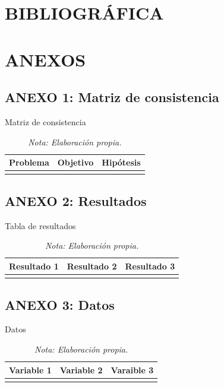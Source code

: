\documentclass[12pt,a4paper]{article} %
\begin{document}
	\section*{BIBLIOGRÁFICA}
		
			
	\newpage
	\section*{ANEXOS}
		\subsection{ANEXO 1: Matriz de consistencia}
			\begin{table}[H]
				\centering
				\caption{Matriz de consistencia}
				\begin{tabular}{p{5cm}p{5cm}p{5cm}}
					\toprule
					Problema & Objetivo & Hipótesis\\
					\midrule
					\lipsum[1] & \lipsum[1] & \lipsum[1]\\
					\bottomrule
				\end{tabular}
				\vspace{2mm}
				\caption*{\it Nota: Elaboración propia.}
				\label{tab: Matriz de consistencia}
			\end{table}
		\newpage
		\subsection{ANEXO 2: Resultados }
			\begin{table}[H]
				\centering
				\caption{Tabla de resultados}
				\begin{tabular}{p{5cm}p{5cm}p{5cm}}
					\toprule
					Resultado 1 & Resultado 2 & Resultado 3\\
					\midrule
					\lipsum[1] & \lipsum[1] & \lipsum[1]\\
					\bottomrule
				\end{tabular}
				\vspace{2mm}
				\caption*{\it Nota: Elaboración propia.}
				\label{tab: Resultados}
			\end{table}
		\newpage
		\subsection{ANEXO 3: Datos }
			\begin{table}[H]
				\centering
				\caption{Datos}
				\begin{tabular}{p{5cm}p{5cm}p{5cm}}
					\toprule
					Variable 1 & Variable 2 & Varaible 3\\
					\midrule
					\lipsum[1] & \lipsum[1] & \lipsum[1]\\
					\bottomrule
				\end{tabular}
				\vspace{2mm}
				\caption*{\it Nota: Elaboración propia.}
				\label{tab: Datos}
			\end{table}
		\newpage 
\end{document}
